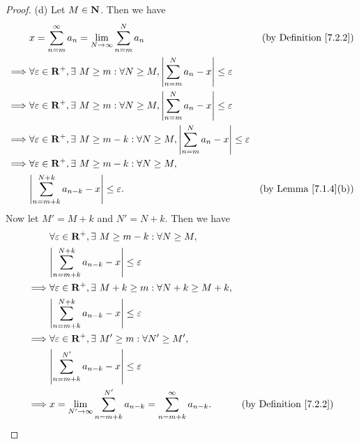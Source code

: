 \begin{proof}{(d)}
    Let \(M \in \mathbf{N}\).
    Then we have
    \begin{align*}
                 & x = \sum_{n = m}^\infty a_n = \lim_{N \to \infty} \sum_{n = m}^N a_n                                                  & \text{(by Definition \ref{7.2.2})} \\
        \implies & \forall \varepsilon \in \R^+, \exists\ M \geq m : \forall N \geq M, \abs{\sum_{n = m}^N a_n - x} \leq \varepsilon                                          \\
        \implies & \forall \varepsilon \in \R^+, \exists\ M \geq m : \forall N \geq M, \abs{\sum_{n = m}^N a_n - x} \leq \varepsilon                                          \\
        \implies & \forall \varepsilon \in \R^+, \exists\ M \geq m - k : \forall N \geq M, \abs{\sum_{n = m}^N a_n - x} \leq \varepsilon                                      \\
        \implies & \forall \varepsilon \in \R^+, \exists\ M \geq m - k : \forall N \geq M,                                                                                    \\
                 & \abs{\sum_{n = m + k}^{N + k} a_{n - k} - x} \leq \varepsilon.                                                        & \text{(by Lemma \ref{7.1.4}(b))}
    \end{align*}
    Now let \(M' = M + k\) and \(N' = N + k\).
    Then we have
    \begin{align*}
                 & \forall \varepsilon \in \R^+, \exists\ M \geq m - k : \forall N \geq M,                                                            \\
                 & \abs{\sum_{n = m + k}^{N + k} a_{n - k} - x} \leq \varepsilon                                                                      \\
        \implies & \forall \varepsilon \in \R^+, \exists\ M + k \geq m : \forall N + k \geq M + k,                                                    \\
                 & \abs{\sum_{n = m + k}^{N + k} a_{n - k} - x} \leq \varepsilon                                                                      \\
        \implies & \forall \varepsilon \in \R^+, \exists\ M' \geq m : \forall N' \geq M',                                                             \\
                 & \abs{\sum_{n = m + k}^{N'} a_{n - k} - x} \leq \varepsilon                                                                         \\
        \implies & x = \lim_{N' \to \infty} \sum_{n = m + k}^{N'} a_{n - k} = \sum_{n = m + k}^\infty a_{n - k}. & \text{(by Definition \ref{7.2.2})}
    \end{align*}
\end{proof}


